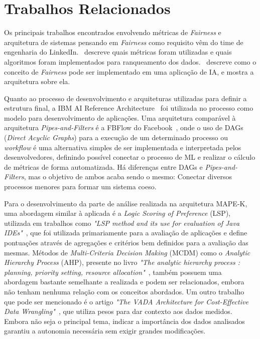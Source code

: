 \documentclass[portugues]{ic-tese}
\begin{document}
\section{Trabalhos Relacionados}
\label{sec:TrabalhosRelacionados}

Os principais trabalhos encontrados envolvendo métricas de \textit{Fairness} e arquitetura de sistemas pensando em \textit{Fairness} como requisito vêm do time de engenharia do LinkedIn.~\citet{Geyik_2019} descreve quais métricas foram utilizadas e quais algoritmos foram implementados para ranqueamento dos dados.~\citet{Kenthapadi_2019} descreve como o conceito de \textit{Fairness} pode ser implementado em uma aplicação de IA, e mostra a arquitetura sobre ela.

Quanto ao processo de desenvolvimento e arquiteturas utilizadas para definir a estrutura final, a IBM AI Reference Architecture~\citep{IBM_2021} foi utilizada no processo como modelo para desenvolvimento de aplicações. Uma arquitetura comparável à arquitetura \textit{Pipes-and-Filters} é a FBFlow do Facebook~\citep{Dunn_2016}, onde o uso de DAGs (\textit{Direct Acyclic Graphs}) para a execução de um determinado processo ou \textit{workflow} é uma alternativa simples de ser implementada e interpretada pelos desenvolvedores, definindo possível conectar o processo de ML e realizar o cálculo de métricas de forma automatizada. Há diferenças entre DAGs e \textit{Pipes-and-Filters}, mas o objetivo de ambos acaba sendo o mesmo: Conectar diversos processos menores para formar um sistema coeso.

Para o desenvolvimento da parte de análise realizada na arquitetura MAPE-K, uma abordagem similar à aplicada é a \textit{Logic Scoring of Preference} (LSP), utilizada em trabalhos como \textit{"LSP method and its use for evaluation of Java IDEs"}~\citep{Dujmovic_2006}, que foi utilizada primariamente para a avaliação de aplicações e define pontuações através de agregações e critérios bem definidos para a avaliação das mesmas. Métodos de \textit{Multi-Criteria Decision Making} (MCDM) como o \textit{Analytic Hierarchy Process} (AHP), presente no livro \textit{"The analytic hierarchy process : planning, priority setting, resource allocation"}~\citep{Saaty_1980}, também possuem uma abordagem bastante semelhante a realizada e podem ser relacionados, embora não tenham nenhuma relação com os conceitos abordados. Um outro trabalho que pode ser mencionado é o artigo \textit{"The VADA Architecture for Cost-Effective Data Wrangling"}~\citep{Konstantinou_2017}, que utiliza pesos para dar contexto aos dados medidos. Embora não seja o principal tema, indicar a importância dos dados analisados garantiu a autonomia necessária sem exigir grandes modificações.
\end{document}
